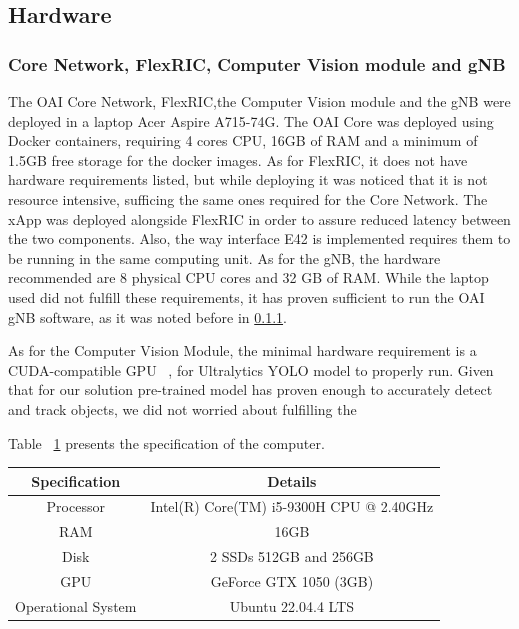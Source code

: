 \subsection{Hardware}
\subsubsection{Core Network, FlexRIC, Computer Vision module and gNB}
The OAI Core Network, FlexRIC,the Computer Vision module and the gNB were deployed in a laptop Acer Aspire A715-74G\@.
The OAI Core was deployed using Docker containers, requiring 4 cores CPU, 16GB of RAM and a minimum of 1.5GB free storage for the docker images.
As for FlexRIC, it does not have hardware requirements listed, but while deploying it was noticed that it is not resource intensive, sufficing the same ones required for the Core Network.
The xApp was deployed alongside FlexRIC in order to assure reduced latency between the two components.
Also,  the way interface E42 is implemented requires them to be running in the same computing unit.
As for the gNB, the hardware recommended are 8 physical CPU cores and 32 GB of RAM\@.
While the laptop used did not fulfill these requirements, it has proven sufficient to run the OAI gNB software, as it was noted before in \ref{}. %

As for the Computer Vision Module, the minimal hardware requirement is a CUDA-compatible GPU ~\cite{}, for Ultralytics YOLO model to properly run.
Given that for our solution pre-trained model has proven enough to accurately detect and track objects, we did not worried about fulfilling the



Table ~\ref{tab:specs_pc} presents the specification of the computer.

\begin{table}[H]
    \begin{tabular}{|c|c|}
        \hline
        \textbf{Specification} & \textbf{Details} \\ \hline
        Processor                      &           Intel(R) Core(TM) i5-9300H CPU @ 2.40GHz   \\ \hline
        RAM                      &          16GB        \\ \hline
        Disk                      &   2 SSDs  512GB and 256GB         \\ \hline
        GPU                     &   GeForce GTX 1050 (3GB)      \\ \hline
        Operational System & Ubuntu 22.04.4 LTS                  \\ \hline
    \end{tabular}\label{tab:specs_pc}
\end{table}

